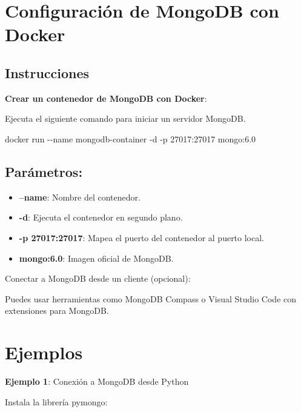 \documentclass[
  a4paper,
  DIV=11,
  numbers=noendperiod,
  onepage,
  openany]{scrreprt}
\newenvironment{Shaded}{\begin{snugshade}}{\end{snugshade}}
\newcommand{\AttributeTok}[1]{\textcolor[rgb]{0.40,0.45,0.13}{#1}}
\newcommand{\ExtensionTok}[1]{\textcolor[rgb]{0.00,0.23,0.31}{#1}}
\newcommand{\NormalTok}[1]{\textcolor[rgb]{0.00,0.23,0.31}{#1}}
\providecommand{\tightlist}{%
  \setlength{\itemsep}{0pt}\setlength{\parskip}{0pt}}\usepackage{longtable,booktabs,array}
\begin{document}
\section{Configuración de MongoDB con
Docker}\label{configuraciuxf3n-de-mongodb-con-docker}

\subsection{Instrucciones}\label{instrucciones-10}

\textbf{Crear un contenedor de MongoDB con Docker}:

Ejecuta el siguiente comando para iniciar un servidor MongoDB.

\begin{Shaded}
\begin{Highlighting}[]
\ExtensionTok{docker}\NormalTok{ run }\AttributeTok{{-}{-}name}\NormalTok{ mongodb{-}container }\AttributeTok{{-}d} \AttributeTok{{-}p}\NormalTok{ 27017:27017 mongo:6.0}
\end{Highlighting}
\end{Shaded}

\subsection{Parámetros:}\label{paruxe1metros-2}

\begin{itemize}
\tightlist
\item
  \textbf{--name}: Nombre del contenedor.
\item
  \textbf{-d}: Ejecuta el contenedor en segundo plano.
\item
  \textbf{-p 27017:27017}: Mapea el puerto del contenedor al puerto
  local.
\item
  \textbf{mongo:6.0}: Imagen oficial de MongoDB.
\end{itemize}

Conectar a MongoDB desde un cliente (opcional):

Puedes usar herramientas como MongoDB Compass o Visual Studio Code con
extensiones para MongoDB.

\section{Ejemplos}\label{ejemplos-7}

\textbf{Ejemplo 1}: Conexión a MongoDB desde Python

Instala la librería pymongo:
\end{document}
